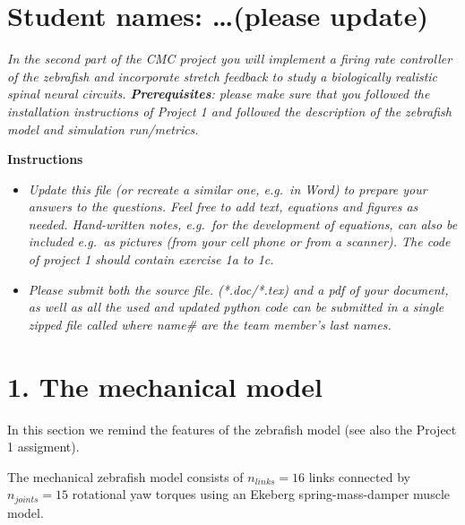 \documentclass{cmc}
\begin{document}
\pagestyle{fancy}
 

\section*{Student names: \ldots (please update)}

\textit{
  In the second part of the CMC project you will implement a firing rate controller of the zebrafish and incorporate stretch feedback to study a biologically realistic spinal neural circuits. \textbf{Prerequisites}: please make sure that you followed the installation instructions of Project 1 and followed the description of the zebrafish model and simulation run/metrics.
}

\textit{
  \textbf{}
}

\textbf{Instructions}

\begin{itemize}
  \item \textit{
    Update this file (or recreate a similar one, e.g.\ in
    Word) to prepare your answers to the questions. Feel free to add text,
    equations and figures as needed. Hand-written notes, e.g.\ for the development
    of equations, can also be included e.g.\ as pictures (from your cell phone or
    from a scanner). The code of project 1 should contain exercise 1a to 1c.
  }
  \item \textit{ Please submit both the source file.
    (*.doc/*.tex) and a pdf of your document, as well as all the used and updated
    python code can be submitted in a single zipped file called \newline
     where name\# are the team
    member's last names.  
  }
\end{itemize}


\section*{1. The mechanical model}\label{sec:mechanical}
In this section we remind the features of the zebrafish model (see also the Project 1 assigment).

The mechanical zebrafish model consists of $n_{links}=16$ links connected by $n_{joints}=15$
rotational yaw torques using an Ekeberg spring-mass-damper muscle model.
\end{document}

